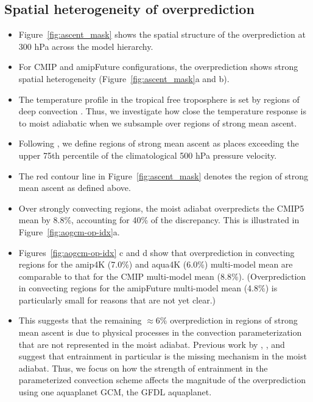 \documentclass{ametsocV5}
\begin{document}
\subsection{Spatial heterogeneity of overprediction}
\begin{itemize}
\item Figure~\ref{fig:ascent_mask} shows the spatial structure of the overprediction at 300 hPa across the model hierarchy.
\item For CMIP and amipFuture configurations, the overprediction shows strong spatial heterogeneity (Figure~\ref{fig:ascent_mask}a and b).
\item The temperature profile in the tropical free troposphere is set by regions of deep convection \citep{bretherton-smolarkiewicz-1989, fueglistaler-et-al-2015, andrews-webb-2018}. Thus, we investigate how close the temperature response is to moist adiabatic when we subsample over regions of strong mean ascent.
\item Following \citet{sherwood-et-al-2014}, we define regions of strong mean ascent as places exceeding the upper 75th percentile of the climatological 500 hPa pressure velocity.
\item The red contour line in Figure~\ref{fig:ascent_mask} denotes the region of strong mean ascent as defined above.
\item Over strongly convecting regions, the moist adiabat overpredicts the CMIP5 mean by 8.8\%, accounting for 40\% of the discrepancy. This is illustrated in Figure~\ref{fig:aogcm-op-idx}a.
\item Figures~\ref{fig:aogcm-op-idx} c and d show that overprediction in convecting regions for the amip4K (7.0\%) and aqua4K (6.0\%) multi-model mean are comparable to that for the CMIP multi-model mean (8.8\%). (Overprediction in convecting regions for the amipFuture multi-model mean (4.8\%) is particularly small for reasons that are not yet clear.)
\item This suggests that the remaining $\approx$6\% overprediction in regions of strong mean ascent is due to physical processes in the convection parameterization that are not represented in the moist adiabat. Previous work by \citet{tripati-et-al-2014}, \citet{po-chedley-et-al-2019}, and \citet{zhou-xie-2019} suggest that entrainment in particular is the missing mechanism in the moist adiabat. Thus, we focus on how the strength of entrainment in the parameterized convection scheme affects the magnitude of the overprediction using one aquaplanet GCM, the GFDL aquaplanet.
\end{itemize}
\end{document}
